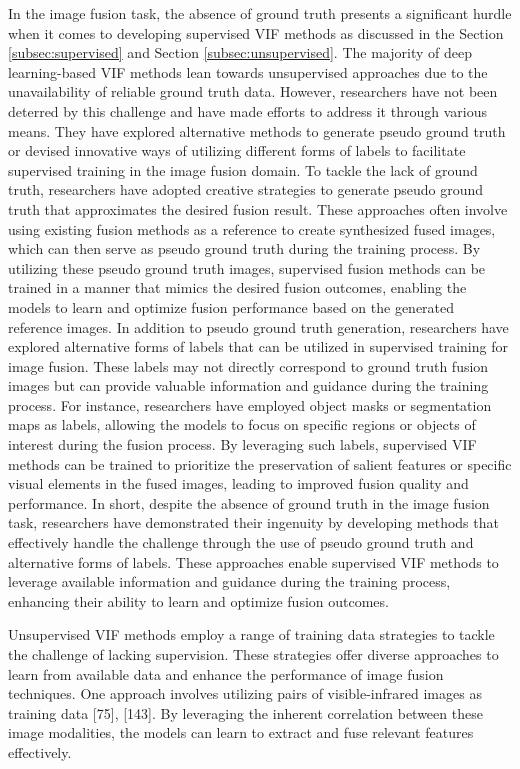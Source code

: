 In the image fusion task, the absence of ground truth presents a significant hurdle when it comes to developing supervised VIF methods as discussed in the Section \ref{subsec:supervised} and Section \ref{subsec:unsupervised}. The majority of deep learning-based VIF methods lean towards unsupervised approaches due to the unavailability of reliable ground truth data. However, researchers have not been deterred by this challenge and have made efforts to address it through various means. They have explored alternative methods to generate pseudo ground truth or devised innovative ways of utilizing different forms of labels to facilitate supervised training in the image fusion domain. To tackle the lack of ground truth, researchers have adopted creative strategies to generate pseudo ground truth that approximates the desired fusion result. These approaches often involve using existing fusion methods as a reference to create synthesized fused images, which can then serve as pseudo ground truth during the training process. By utilizing these pseudo ground truth images, supervised fusion methods can be trained in a manner that mimics the desired fusion outcomes, enabling the models to learn and optimize fusion performance based on the generated reference images. In addition to pseudo ground truth generation, researchers have explored alternative forms of labels that can be utilized in supervised training for image fusion. These labels may not directly correspond to ground truth fusion images but can provide valuable information and guidance during the training process. For instance, researchers have employed object masks or segmentation maps as labels, allowing the models to focus on specific regions or objects of interest during the fusion process. By leveraging such labels, supervised VIF methods can be trained to prioritize the preservation of salient features or specific visual elements in the fused images, leading to improved fusion quality and performance. In short, despite the absence of ground truth in the image fusion task, researchers have demonstrated their ingenuity by developing methods that effectively handle the challenge through the use of pseudo ground truth and alternative forms of labels. These approaches enable supervised VIF methods to leverage available information and guidance during the training process, enhancing their ability to learn and optimize fusion outcomes.

Unsupervised VIF methods employ a range of training data strategies to tackle the challenge of lacking supervision. These strategies offer diverse approaches to learn from available data and enhance the performance of image fusion techniques. One approach involves utilizing pairs of visible-infrared images as training data \cite{rao2023tgfuse} [75], [143]. By leveraging the inherent correlation between these image modalities, the models can learn to extract and fuse relevant features effectively.

